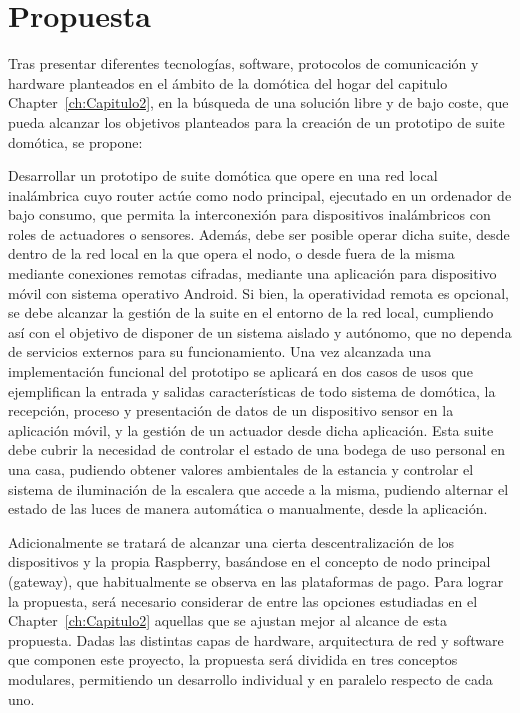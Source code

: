 \cleardoublepage

\chapter{Propuesta}
\label{ch:Capitulo3}

Tras presentar diferentes tecnologías, software, protocolos de comunicación y hardware planteados en el ámbito de la domótica del hogar del capitulo Chapter~\ref{ch:Capitulo2}, en la búsqueda de una solución libre y de bajo coste, que pueda alcanzar los objetivos planteados para la creación de un prototipo de suite domótica, se propone:

\vspace{1cm}

Desarrollar un prototipo de suite domótica que opere en una red local inalámbrica cuyo router actúe como nodo principal, ejecutado en un ordenador de bajo consumo, que permita la interconexión para dispositivos inalámbricos con roles de actuadores o sensores. Además, debe ser posible operar dicha suite, desde dentro de la red local en la que opera el nodo, o desde fuera de la misma mediante conexiones remotas cifradas, mediante una aplicación para dispositivo móvil con sistema operativo Android. Si bien, la operatividad remota es opcional, se debe alcanzar la gestión de la suite en el entorno de la red local, cumpliendo así con el objetivo de disponer de un sistema aislado y autónomo, que no dependa de servicios externos para su funcionamiento. Una vez alcanzada una implementación funcional del prototipo se aplicará en dos casos de usos que ejemplifican la entrada y salidas características de todo sistema de domótica, la recepción, proceso y presentación de datos de un dispositivo sensor en la aplicación móvil, y la gestión de un actuador desde dicha aplicación. Esta suite debe cubrir la necesidad de controlar el estado de una bodega de uso personal en una casa, pudiendo obtener valores ambientales de la estancia y controlar el sistema de iluminación de la escalera que accede a la misma, pudiendo alternar el estado de las luces de manera automática o manualmente, desde la aplicación. 

\vspace{1cm}

Adicionalmente se tratará de alcanzar una cierta descentralización de los dispositivos y la propia Raspberry, basándose en el concepto de nodo principal (gateway), que habitualmente se observa en las plataformas de pago. Para lograr la propuesta, será necesario considerar de entre las opciones estudiadas en el  Chapter~\ref{ch:Capitulo2} aquellas que se ajustan mejor al alcance de esta propuesta. Dadas las distintas capas de hardware, arquitectura de red y software que componen este proyecto, la propuesta será dividida en tres conceptos modulares, permitiendo un desarrollo individual y en paralelo respecto de cada uno.

